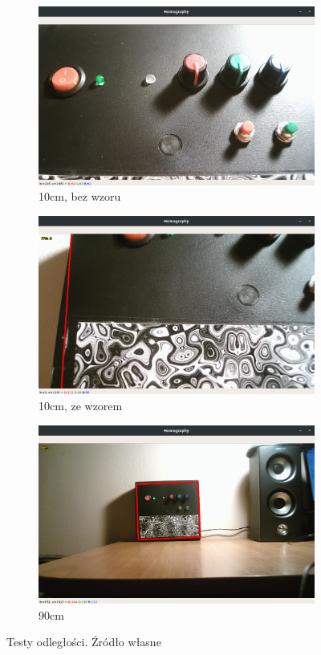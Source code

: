 \documentclass[12pt,twoside,polish]{article}
\begin{document}
\begin{figure}[htb!]
	\begin{subfigure}[b]{0.5\textwidth}
		\includegraphics[width=\textwidth]{test_close1}
		\caption{10cm, bez wzoru}
		\label{test_close1}
	\end{subfigure}
	\begin{subfigure}[b]{0.5\textwidth}
		\includegraphics[width=\textwidth]{test_close2}
		\caption{10cm, ze wzorem}
		\label{test_close2}
	\end{subfigure}
	\begin{subfigure}[b]{0.5\textwidth}
		\includegraphics[width=\textwidth]{test_close3}
		\caption{90cm}
		\label{test_close3}
	\end{subfigure}
	\caption{Testy odległości. Źródło własne}
\end{figure}
\FloatBarrier
\end{document}
